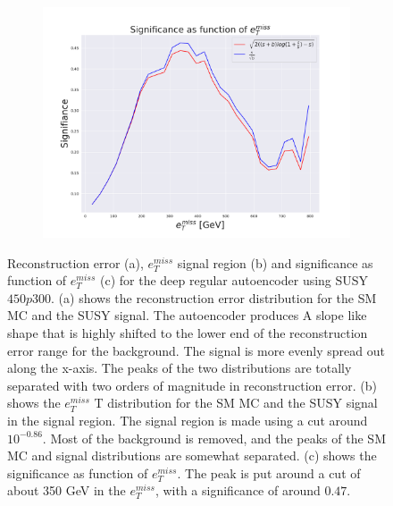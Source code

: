 \begin{figure}[H]
    \hfill  
    \begin{subfigure}{.40\textwidth}
        \includegraphics[width=\textwidth]{Figures/AE_testing/small/2lep/significance_etmiss_450p0p0300_-0.8583753266807368.pdf}
        \caption{}
        \label{fig:AE_2lep_small_signi_450_3}
    \end{subfigure}
    \hfill      
    \caption[2lep shallow network | $450p300$ | AE | 3]{Reconstruction error (a), $e_T^{miss}$ signal region (b) and significance as function of 
    $e_T^{miss}$ (c) for the deep regular autoencoder using SUSY $450p300$. 
    (a) shows the reconstruction error distribution for the SM MC and the SUSY signal. 
    The autoencoder produces A slope like shape that is highly shifted to the lower end of the reconstruction error range
for the background. The signal is more evenly spread out along the x-axis. The peaks of the two distributions are totally separated
with two orders of magnitude in reconstruction error. (b) shows the $e_T^{miss}$
T distribution for the SM MC and the SUSY signal in the signal region. The signal region is made using a cut around
$10^{-0.86}$. Most of the background is removed, and the peaks of the SM MC and signal distributions are
somewhat separated. (c) shows the significance as function of $e_T^{miss}$. The peak is put 
around a cut of about 350 GeV in the $e_T^{miss}$, with a significance of around $0.47$.}
    \label{fig:AE_2lep_small_rec_sig_signi_450_3}
\end{figure}


